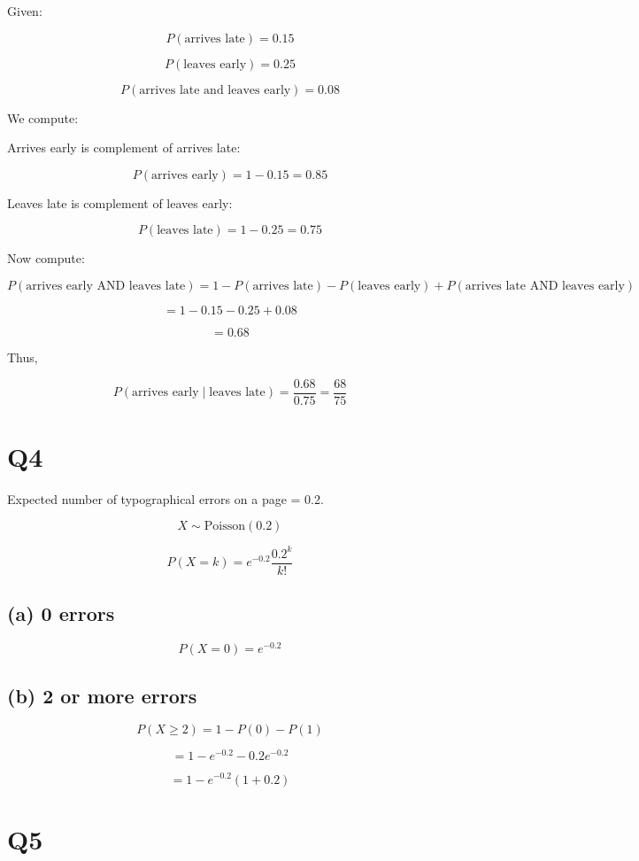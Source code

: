 \documentclass[12pt]{article}
\begin{document}
Given:

\[
P(\text{arrives late}) = 0.15
\]

\[
P(\text{leaves early}) = 0.25
\]

\[
P(\text{arrives late and leaves early}) = 0.08
\]

We compute:

Arrives early is complement of arrives late:

\[
P(\text{arrives early}) = 1 - 0.15 = 0.85
\]

Leaves late is complement of leaves early:

\[
P(\text{leaves late}) = 1 - 0.25 = 0.75
\]

Now compute:

\[
P(\text{arrives early AND leaves late})
=
1 - P(\text{arrives late}) - P(\text{leaves early}) + P(\text{arrives late AND leaves early})
\]

\[
= 1 - 0.15 - 0.25 + 0.08
\]

\[
= 0.68
\]

Thus,

\[
P(\text{arrives early} \mid \text{leaves late})
=
\frac{0.68}{0.75}
=
\frac{68}{75}
\]

\section*{Q4}

Expected number of typographical errors on a page = 0.2.

\[
X \sim \text{Poisson}(0.2)
\]

\[
P(X=k) = e^{-0.2}\frac{0.2^k}{k!}
\]

\subsection*{(a) 0 errors}

\[
P(X=0) = e^{-0.2}
\]

\subsection*{(b) 2 or more errors}

\[
P(X \ge 2)
=
1 - P(0) - P(1)
\]

\[
= 1 - e^{-0.2} - 0.2 e^{-0.2}
\]

\[
= 1 - e^{-0.2}(1+0.2)
\]

\section*{Q5}
\end{document}
